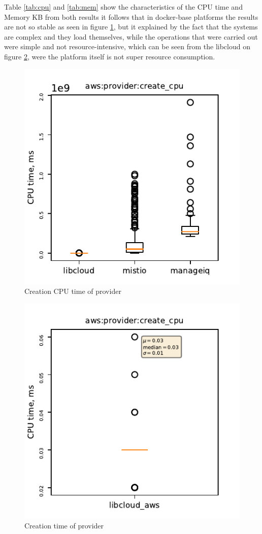 Table \ref{tab:cpu} and \ref{tab:mem} show the characteristics of the CPU time and Memory KB
from both results it follows that in docker-base platforms the results are not so stable as seen in figure \ref{crecpu}, but it explained by the fact that the systems are complex and they load themselves, while the operations that were carried out were simple and not resource-intensive, which can be seen from the libcloud on figure \ref{libaws}, were the platform itself is not super resource consumption.
\begin{figure}[htbp]
\centerline{\includegraphics[scale=1]{pics/provider_create_cpu.pdf}}
\caption{Creation CPU time of provider}
\label{crecpu}
\end{figure}

\begin{figure}[htbp]
\centerline{\includegraphics[scale=1]{pics/libcloud_aws.pdf}}
\caption{Creation time of provider}
\label{libaws}
\end{figure}

